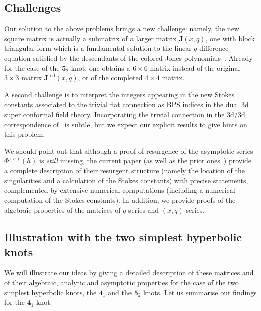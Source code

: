 \documentclass[12pt,reqno]{amsart}
\theoremstyle{definition}
\def\s{\sigma}
\def\bJ{\mathbf J}
\def\RED{\mathrm{red}}
\def\md{\mathbf}
\newcommand{\knot}[1]{\md{#1}}
\begin{document}
\subsection{Challenges}
\label{sub.challenge}

Our solution to the above problems brings a new challenge: namely, the new square
matrix is actually a submatrix of a larger matrix $\bJ(x,q)$, one with block
triangular form which is a fundamental solution to the linear $q$-difference
equation satisfied by the descendants of the colored Jones
polynomials~\cite{GK:desc}. Already for the case of the $\knot{5}_2$ knot,
one obtains a $6 \times 6$ matrix instead of the original $3 \times 3$
matrix $\bJ^\RED(x,q)$, or of the completed $4 \times 4$ matrix.

A second challenge is to interpret the integers appearing in the new Stokes constants
associated to the trivial flat connection as BPS indices in the dual 3d super
conformal field theory. Incorporating the trivial connection in the
3d/3d correspondence of~\cite{DGG1} is subtle, but we expect our explicit results
to give hints on this problem.   

We should point out that although a proof of resurgence of the
asymptotic series $\Phi^{(\s)}(h)$ is \emph{still} missing, the
current paper (as well as the prior ones~\cite{GGM:resurgent,GGM:peacock}) provide
a complete description of
their resurgent structure (namely the location of the singularities
and a calculation of the Stokes constants) with precise statements,
complemented by extensive numerical computations (including a
numerical computation of the Stokes constants).  In addition, we
provide proofs of the algebraic properties of the matrices of
$q$-series and $(x,q)$-series.

\subsection{Illustration with the two simplest hyperbolic knots}
\label{sub.4152}

We will illustrate our ideas by giving a detailed description of these matrices
and of their algebraic, analytic and asymptotic properties for the case of the two
simplest hyperbolic knots, the $\knot{4}_1$ and the $\knot{5}_2$ knots. Let us summarise our findings
for the $\knot{4}_1$ knot.
\end{document}
